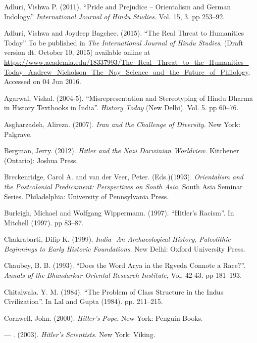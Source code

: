 \begin{thebibliography}{99}
\itemsep=0pt
 Adluri, Vishwa P. (2011). “Pride and Prejudice – Orientalism and German Indology.” \textit{International Journal of Hindu Studies.} Vol. 15, 3. pp 253--92.

  Adluri, Vishwa and Joydeep Bagchee. (2015). “The Real Threat to Humanities Today” To be published in \textit{The International Journal of Hindu Studies}. (Draft version dt. October 10, 2015) available online at \url{https://www.academia.edu/18337993/The_Real_Threat_to_the_Humanities_Today_Andrew_Nicholson_The_Nay_Science_and_the_Future_of_Philology}. Accessed on 04 Jun 2016.

  Agarwal, Vishal. (2004-5). “Misrepresentation and Stereotyping of Hindu Dharma in History Textbooks in India”. \textit{History Today} (New Delhi). Vol. 5. pp 60--76.

  Asgharzadeh, Alireza. (2007). \textit{Iran and the Challenge of Diversity. }New York: Palgrave.

  Bergman, Jerry. (2012). \textit{Hitler and the Nazi Darwinian Worldview.} Kitchener (Ontario): Joshua Press.

  Breckenridge, Carol A. and van der Veer, Peter. (Eds.)(1993). \textit{Orientalism and the Postcolonial Predicament: Perspectives on South Asia}. South Asia Seminar Series. Philadelphia: University of Pennsylvania Press.

  Burleigh, Michael and Wolfgang Wippermann. (1997). “Hitler’s Racism”. In Mitchell (1997). pp 83--87.

  Chakrabarti, Dilip K. (1999). \textit{India- An Archaeological History, Paleolithic Beginnings to Early Historic Foundations}. New Delhi: Oxford University Press.

  Chaubey, B. B. (1993). “Does the Word Arya in the Rgveda Connote a Race?”. \textit{Annals of the Bhandarkar Oriental Research Institute}, Vol. 42-43. pp 181--193.

  Chitalwala. Y. M. (1984). “The Problem of Class Structure in the Indus Civilization”. In Lal and Gupta (1984). pp. 211--215.

  Cornwell, John. (2000). \textit{Hitler’s Pope. }New York: Penguin Books.

  — . (2003). \textit{Hitler’s Scientists.} New York: Viking.


\end{thebibliography}
